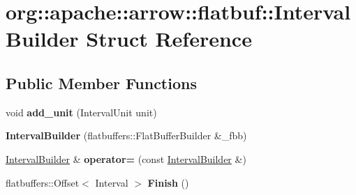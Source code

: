 \hypertarget{structorg_1_1apache_1_1arrow_1_1flatbuf_1_1IntervalBuilder}{}\section{org\+:\+:apache\+:\+:arrow\+:\+:flatbuf\+:\+:Interval\+Builder Struct Reference}
\label{structorg_1_1apache_1_1arrow_1_1flatbuf_1_1IntervalBuilder}
\subsection*{Public Member Functions}
\begin{DoxyCompactItemize}
\item 
void {\bfseries add\+\_\+unit} (Interval\+Unit unit)\hypertarget{structorg_1_1apache_1_1arrow_1_1flatbuf_1_1IntervalBuilder_abe1ff152ea58cfa64e141b64817e115e}{}\label{structorg_1_1apache_1_1arrow_1_1flatbuf_1_1IntervalBuilder_abe1ff152ea58cfa64e141b64817e115e}

\item 
{\bfseries Interval\+Builder} (flatbuffers\+::\+Flat\+Buffer\+Builder \&\+\_\+fbb)\hypertarget{structorg_1_1apache_1_1arrow_1_1flatbuf_1_1IntervalBuilder_a2c2d54682d6c01dce88b9b520db74d3c}{}\label{structorg_1_1apache_1_1arrow_1_1flatbuf_1_1IntervalBuilder_a2c2d54682d6c01dce88b9b520db74d3c}

\item 
\hyperlink{structorg_1_1apache_1_1arrow_1_1flatbuf_1_1IntervalBuilder}{Interval\+Builder} \& {\bfseries operator=} (const \hyperlink{structorg_1_1apache_1_1arrow_1_1flatbuf_1_1IntervalBuilder}{Interval\+Builder} \&)\hypertarget{structorg_1_1apache_1_1arrow_1_1flatbuf_1_1IntervalBuilder_a3c824cfa4073e837b493159216408ba1}{}\label{structorg_1_1apache_1_1arrow_1_1flatbuf_1_1IntervalBuilder_a3c824cfa4073e837b493159216408ba1}

\item 
flatbuffers\+::\+Offset$<$ Interval $>$ {\bfseries Finish} ()\hypertarget{structorg_1_1apache_1_1arrow_1_1flatbuf_1_1IntervalBuilder_a4cac40f2d6f7f4efbd96b7bf5b96deb2}{}\label{structorg_1_1apache_1_1arrow_1_1flatbuf_1_1IntervalBuilder_a4cac40f2d6f7f4efbd96b7bf5b96deb2}

\end{DoxyCompactItemize}
